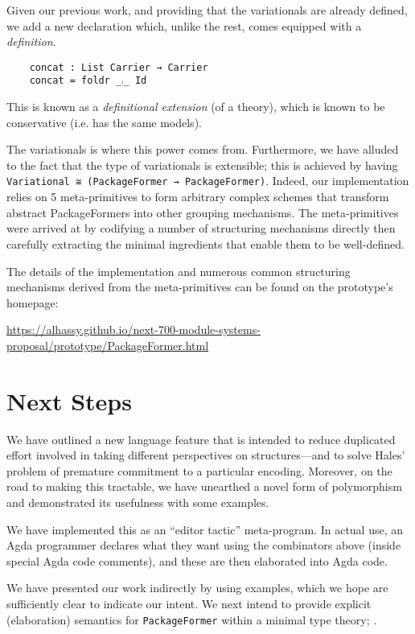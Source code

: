 \documentclass[sigplan,screen]{acmart}
\begin{document}
\noindent
Given our previous work, and providing that the variationals are already
defined, we add a new declaration which, unlike the rest, comes
equipped with a \emph{definition}.
  \vspace{0.3em}
\begin{verbatim}
    concat : List Carrier → Carrier
    concat = foldr _⨾_ Id
\end{verbatim}
\noindent This is known as a \emph{definitional extension} (of a theory), which
is known to be conservative (i.e. has the same models).

The variationals is where this power comes from.  Furthermore, we have alluded to
the fact that the type of variationals
is extensible; this is achieved by having
\texttt{Variational ≅ (PackageFormer → PackageFormer)}.
Indeed, our implementation relies on 5 meta-primitives to form arbitrary
complex schemes that transform abstract PackageFormers into
other grouping mechanisms. The meta-primitives were arrived at by codifying
a number of structuring mechanisms directly then carefully extracting the minimal
ingredients that enable them to be well-defined.

The details of the implementation and numerous common structuring mechanisms
derived from the meta-primitives can be found on the prototype's homepage:
\begin{center}
\url{https://alhassy.github.io/next-700-module-systems-proposal/prototype/PackageFormer.html}
\end{center}

\section{Next Steps}
\label{sec:org99a0c23}
We have outlined a new language feature that is intended to reduce
duplicated effort involved in taking different perspectives on structures---and to solve
Hales' problem of premature commitment to a particular encoding. Moreover, on the road
to making this tractable, we have unearthed a novel form of polymorphism and demonstrated
its usefulness with some examples.

We have implemented this as an “editor tactic'' meta-program.
In actual use, an Agda programmer declares what they want
using the combinators above (inside special Agda code comments),
and these are then elaborated into Agda code.

We have presented our work indirectly by using examples, which we
hope are sufficiently clear to indicate our intent. We next intend to
provide explicit (elaboration) semantics for \texttt{PackageFormer} within a
minimal type theory; \newline \cite{types_for_modules}.
\end{document}
